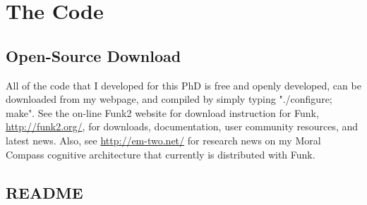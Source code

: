 \chapter{The Code}\label{appendix:the_code}

\section{Open-Source Download}

All of the code that I developed for this PhD is free and openly
developed, can be downloaded from my webpage, and compiled by simply
typing "./configure; make".  See the on-line Funk2 website for
download instruction for Funk, \url{http://funk2.org/}, for downloads,
documentation, user community resources, and latest news.  Also, see
\url{http://em-two.net/} for research news on my Moral Compass
cognitive architecture that currently is distributed with Funk.

\section{README}

